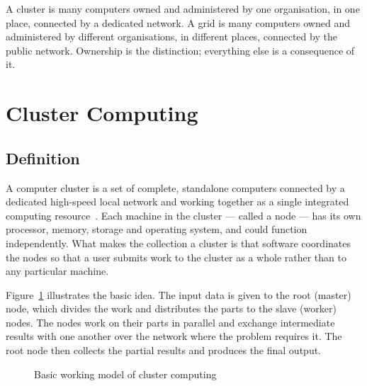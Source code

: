 \documentclass[../main.tex]{subfiles}
\begin{document}
\begin{notebox}
A cluster is many computers owned and administered by one organisation, in
one place, connected by a dedicated network. A grid is many computers owned
and administered by different organisations, in different places, connected
by the public network. Ownership is the distinction; everything else is a
consequence of it.
\end{notebox}


\section{Cluster Computing}

\subsection{Definition}

A computer cluster is a set of complete, standalone computers connected by a
dedicated high-speed local network and working together as a single
integrated computing resource~. Each machine in the cluster --- called a
node --- has its own processor, memory, storage and operating system, and
could function independently. What makes the collection a cluster is that
software coordinates the nodes so that a user submits work to the cluster as
a whole rather than to any particular machine.

Figure~\ref{fig:basic} illustrates the basic idea. The input data is given to
the root (master) node, which divides the work and distributes the parts to
the slave (worker) nodes. The nodes work on their parts in parallel and
exchange intermediate results with one another over the network where the
problem requires it. The root node then collects the partial results and
produces the final output.

\begin{figure}[!htb]
\centering
{}
\caption{Basic working model of cluster computing}
\label{fig:basic}
\end{figure}
\end{document}
